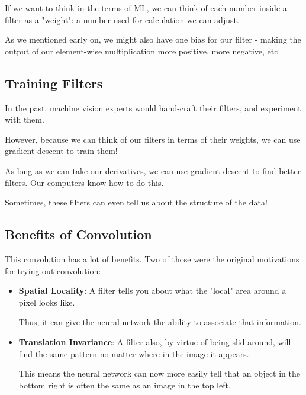         If we want to think in the terms of ML, we can think of each number inside a filter as a "weight": a number used for calculation we can adjust.
        
        As we mentioned early on, we might also have one bias for our filter - making the output of our element-wise multiplication more positive, more negative, etc.
        
    \subsection{Training Filters}
    
        In the past, machine vision experts would hand-craft their filters, and experiment with them. 
        
        However, because we can think of our filters in terms of their weights, we can use gradient descent to train them!
        
        As long as we can take our derivatives, we can use gradient descent to find better filters. Our computers know how to do this.
        
        Sometimes, these filters can even tell us about the structure of the data!
        
        
    \subsection{Benefits of Convolution}
    
        This convolution has a lot of benefits. Two of those were the original motivations for trying out convolution:
        
        \begin{itemize}
            \item \textbf{Spatial Locality}: A filter tells you about what the "local" area around a pixel looks like.
            
            Thus, it can give the neural network the ability to associate that information.
            
            \item \textbf{Translation Invariance}: A filter also, by virtue of being slid around, will find the same pattern no matter where in the image it appears.
            
            This means the neural network can now more easily tell that an object in the bottom right is often the same as an image in the top left.
            
        \end{itemize}
        
